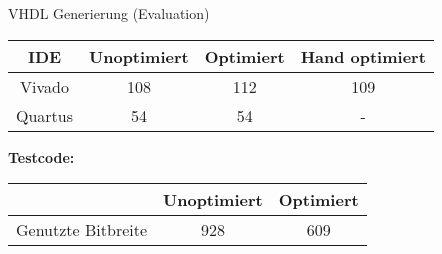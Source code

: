 \begin{frame}{VHDL Generierung (Evaluation)}
\begin{tabular}{c | c | c | c}
	IDE    & Unoptimiert & Optimiert & Hand optimiert \\
	\hline
	Vivado & 108 & 112 & 109 \\
	Quartus & 54 & 54 & - \\
\end{tabular}
\newline
\newline
\newline
\newline
\newline
\textbf{Testcode:} 
\newline
\begin{tabular}{ c | c | c }
	& Unoptimiert & Optimiert \\
	\hline
	Genutzte Bitbreite & 928 & 609 \\
\end{tabular}
\end{frame}
